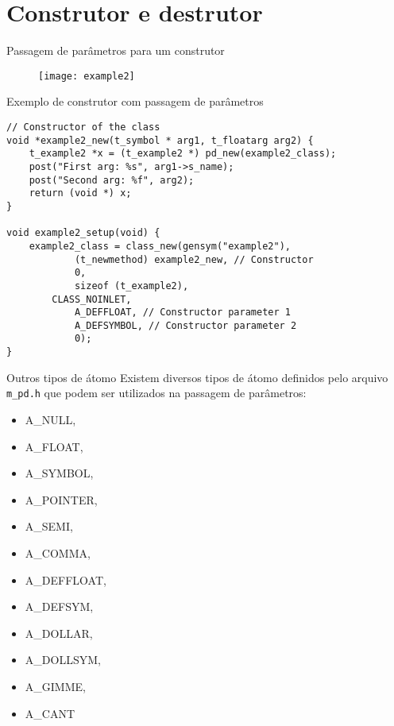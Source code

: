 \section{Construtor e destrutor}


\begin{frame}{Passagem de parâmetros para um construtor}
\begin{figure}
\centering
\texttt{[image: example2]}
\end{figure}
\end{frame}


\begin{frame}[fragile]{Exemplo de construtor com passagem de parâmetros}
\begin{lstlisting}
// Constructor of the class
void *example2_new(t_symbol * arg1, t_floatarg arg2) {
    t_example2 *x = (t_example2 *) pd_new(example2_class);
    post("First arg: %s", arg1->s_name);
    post("Second arg: %f", arg2);
    return (void *) x;
}

void example2_setup(void) {
    example2_class = class_new(gensym("example2"),
            (t_newmethod) example2_new, // Constructor
            0,
            sizeof (t_example2),
	    CLASS_NOINLET,
            A_DEFFLOAT, // Constructor parameter 1
            A_DEFSYMBOL, // Constructor parameter 2
            0);
}
\end{lstlisting}
\end{frame}


\begin{frame}{Outros tipos de átomo}
Existem diversos tipos de átomo definidos pelo arquivo \texttt{m\_pd.h} que
podem ser utilizados na passagem de parâmetros:
\begin{itemize}
\item A\_NULL,
\item A\_FLOAT,
\item A\_SYMBOL,
\item A\_POINTER,
\item A\_SEMI,
\item A\_COMMA,
\item A\_DEFFLOAT,
\item A\_DEFSYM,
\item A\_DOLLAR, 
\item A\_DOLLSYM,
\item A\_GIMME,
\item A\_CANT
\end{itemize}
\end{frame}


